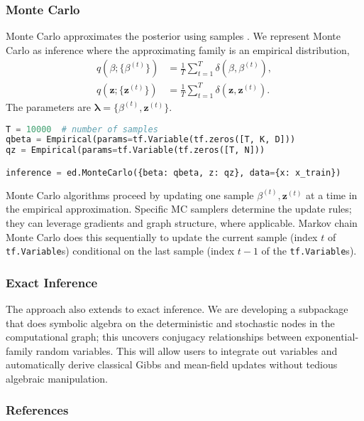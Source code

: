 \subsubsection{Monte Carlo}

Monte Carlo approximates the posterior using samples
\citep{robert1999monte}. We represent Monte Carlo as inference where
the approximating family is an empirical distribution,
\begin{align*}
q(\beta; \{\beta^{(t)}\})
&= \frac{1}{T}\sum_{t=1}^T \delta(\beta, \beta^{(t)}), \\[1.5ex]
q(\mathbf{z}; \{\mathbf{z}^{(t)}\})
&= \frac{1}{T}\sum_{t=1}^T \delta(\mathbf{z}, \mathbf{z}^{(t)}).
\end{align*}
The parameters are $\mathbf{\lambda}=\{\beta^{(t)},\mathbf{z}^{(t)}\}$.
\begin{lstlisting}[language=Python]
T = 10000  # number of samples
qbeta = Empirical(params=tf.Variable(tf.zeros([T, K, D]))
qz = Empirical(params=tf.Variable(tf.zeros([T, N]))

inference = ed.MonteCarlo({beta: qbeta, z: qz}, data={x: x_train})
\end{lstlisting}
Monte Carlo
algorithms proceed by updating one sample $\beta^{(t)},\mathbf{z}^{(t)}$ at a time in the empirical
approximation.
Specific \gls{MC} samplers determine the update rules;
they can leverage gradients and graph structure, where applicable.
Markov chain Monte Carlo does this sequentially to update
the current sample (index $t$ of \texttt{tf.Variable}s) conditional on
the last sample (index $t-1$ of the \texttt{tf.Variable}s).

\subsubsection{Exact Inference}

The approach also extends to exact inference. We are developing a
subpackage that does symbolic algebra on the deterministic and
stochastic nodes in the computational graph; this uncovers conjugacy
relationships between exponential-family random variables. This will
allow users to integrate out variables and automatically derive
classical Gibbs and mean-field updates \citep{bishop2006pattern} without
tedious algebraic manipulation.

\subsubsection{References}\label{references}
